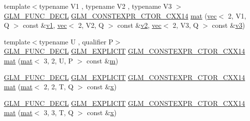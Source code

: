 \begin{DoxyCompactItemize}
\item 
{\footnotesize template$<$typename V1 , typename V2 , typename V3 $>$ }\\\hyperlink{setup_8hpp_ab2d052de21a70539923e9bcbf6e83a51}{G\+L\+M\+\_\+\+F\+U\+N\+C\+\_\+\+D\+E\+CL} \hyperlink{setup_8hpp_a0900f9145e68bf6061b6f5e7be3fa751}{G\+L\+M\+\_\+\+C\+O\+N\+S\+T\+E\+X\+P\+R\+\_\+\+C\+T\+O\+R\+\_\+\+C\+X\+X14} \hyperlink{structglm_1_1mat_3_013_00_012_00_01_t_00_01_q_01_4_a05957fdeea53e736c395bc5c818f87cd}{mat} (\hyperlink{structglm_1_1vec}{vec}$<$ 2, V1, Q $>$ const \&\hyperlink{_s_d_l__opengl__glext_8h_a435c176a02c061b43e19bdf7c86cceae}{v1}, \hyperlink{structglm_1_1vec}{vec}$<$ 2, V2, Q $>$ const \&\hyperlink{_s_d_l__opengl__glext_8h_a0928f6d0f0f794ba000a21dfae422136}{v2}, \hyperlink{structglm_1_1vec}{vec}$<$ 2, V3, Q $>$ const \&\hyperlink{_s_d_l__opengl__glext_8h_acc806b31cbf466ceba6555983d8b814d}{v3})
\item 
{\footnotesize template$<$typename U , qualifier P$>$ }\\\hyperlink{setup_8hpp_ab2d052de21a70539923e9bcbf6e83a51}{G\+L\+M\+\_\+\+F\+U\+N\+C\+\_\+\+D\+E\+CL} \hyperlink{setup_8hpp_a6c74f5a5e7b134ab69023ff9a30d4d5d}{G\+L\+M\+\_\+\+E\+X\+P\+L\+I\+C\+IT} \hyperlink{setup_8hpp_a0900f9145e68bf6061b6f5e7be3fa751}{G\+L\+M\+\_\+\+C\+O\+N\+S\+T\+E\+X\+P\+R\+\_\+\+C\+T\+O\+R\+\_\+\+C\+X\+X14} \hyperlink{structglm_1_1mat_3_013_00_012_00_01_t_00_01_q_01_4_ad6c2490865785641ce19a850997227ff}{mat} (\hyperlink{structglm_1_1mat}{mat}$<$ 3, 2, U, P $>$ const \&\hyperlink{_s_d_l__opengl__glext_8h_af593500c283bf1a787a6f947f503a5c2}{m})
\item 
\hyperlink{setup_8hpp_ab2d052de21a70539923e9bcbf6e83a51}{G\+L\+M\+\_\+\+F\+U\+N\+C\+\_\+\+D\+E\+CL} \hyperlink{setup_8hpp_a6c74f5a5e7b134ab69023ff9a30d4d5d}{G\+L\+M\+\_\+\+E\+X\+P\+L\+I\+C\+IT} \hyperlink{setup_8hpp_a0900f9145e68bf6061b6f5e7be3fa751}{G\+L\+M\+\_\+\+C\+O\+N\+S\+T\+E\+X\+P\+R\+\_\+\+C\+T\+O\+R\+\_\+\+C\+X\+X14} \hyperlink{structglm_1_1mat_3_013_00_012_00_01_t_00_01_q_01_4_a25c9c73a24a4e8f13ba8694642a43387}{mat} (\hyperlink{structglm_1_1mat}{mat}$<$ 2, 2, T, Q $>$ const \&\hyperlink{_s_d_l__opengl_8h_ad0e63d0edcdbd3d79554076bf309fd47}{x})
\item 
\hyperlink{setup_8hpp_ab2d052de21a70539923e9bcbf6e83a51}{G\+L\+M\+\_\+\+F\+U\+N\+C\+\_\+\+D\+E\+CL} \hyperlink{setup_8hpp_a6c74f5a5e7b134ab69023ff9a30d4d5d}{G\+L\+M\+\_\+\+E\+X\+P\+L\+I\+C\+IT} \hyperlink{setup_8hpp_a0900f9145e68bf6061b6f5e7be3fa751}{G\+L\+M\+\_\+\+C\+O\+N\+S\+T\+E\+X\+P\+R\+\_\+\+C\+T\+O\+R\+\_\+\+C\+X\+X14} \hyperlink{structglm_1_1mat_3_013_00_012_00_01_t_00_01_q_01_4_a0a820cd88c9add37c061f4b49ebf9570}{mat} (\hyperlink{structglm_1_1mat}{mat}$<$ 3, 3, T, Q $>$ const \&\hyperlink{_s_d_l__opengl_8h_ad0e63d0edcdbd3d79554076bf309fd47}{x})

\end{DoxyCompactItemize}
